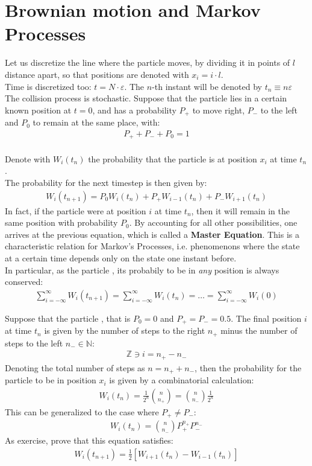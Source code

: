 \documentclass[../template.tex]{subfiles}
\begin{document}
\section{Brownian motion and Markov Processes}
Let us discretize the line where the particle moves, by dividing it in points of $l$ distance apart, so that positions are denoted with $x_i = i \cdot l$.\\
Time is discretized too: $t=N \cdot \varepsilon$. The $n$-th instant will be denoted by $t_n \equiv n \varepsilon$\\
The collision process is stochastic. Suppose that the particle lies in a certain known position at $t=0$,
and has a probability $P_+$ to move right, $P_-$ to the left and $P_0$ to remain at the same place, with:
\begin{align*}
    P_+ + P_- + P_0 = 1
\end{align*}
\\
Denote with $W_i(t_n)$ the probability that the particle is at position $x_i$ at time $t_n$.\\
The probability for the next timestep is then given by:
\begin{align*}
    W_i(t_{n+1}) = P_0 W_i(t_n) + P_+ W_{i-1}(t_n) + P_- W_{i+1}(t_n)
\end{align*}
In fact, if the particle were at position $i$ at time $t_n$, then it will remain in the same position with probability $P_0$. By accounting for all other possibilities, one arrives at the previous equation, which is called a \textbf{Master Equation}. 
This is a characteristic relation for Markov's Processes, i.e. phenomenons where the state at a certain time depends only on the state one instant before. \\
In particular, as the particle , its probabily to be in \textit{any} position is always conserved: 
\begin{align*}
    \sum_{i=-\infty}^{\infty} W_i(t_{n+1}) = \sum_{i=-\infty}^{\infty} W_i(t_n) = \dots = \sum_{i=-\infty}^{\infty} W_i(0)
\end{align*}

Suppose that the particle , that is $P_0 = 0$ and $P_+ = P_- = 0.5$. The final position $i$ at time $t_n$ is given by the number of steps to the right $n_+$ minus the number of steps to the left $n_- \in \mathbb{N}$:
\begin{align*}
    \mathbb{Z} \ni i = n_+ - n_-
\end{align*}
Denoting the total number of steps as $n = n_+ + n_-$, then the probability for the particle to be in position $x_i$ is given by a combinatorial calculation: 
\begin{align*}
    W_i(t_n) = \frac{1}{2^n} {{n}\choose{n_+}} = {n\choose n_-} \frac{1}{2^n}
\end{align*}
This can be generalized to the case where $P_+ \neq P_-$:
\begin{align*}
    W_i(t_n) = {n\choose n_-} P_+^{n_+} P_-^{n_-}
\end{align*}
As exercise, prove that this equation satisfies: 
\begin{align*}
    W_i(t_{n+1}) = \frac{1}{2} [W_{i+1}(t_n) - W_{i-1}(t_n)]
\end{align*}
\end{document}
